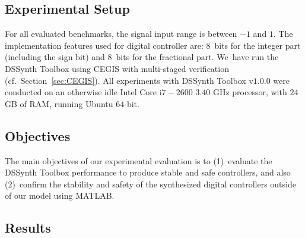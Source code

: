 \documentclass[conference]{IEEEtran}
\newcommand\tool{{DSSynth Toolbox}\xspace}
\begin{document}

\subsection{Experimental Setup}
\label{experimental-setup}

For all evaluated benchmarks, the signal input range is between $-1$ and $1$.  
The implementation features used for
digital controller are: $8$~bits for the integer part (including the sign
bit) and $8$~bits for the fractional part.  We~have run the \tool using
CEGIS with multi-staged verification (cf.~Section~\ref{sec:CEGIS}).  All
experiments with \tool v$1$.$0$.$0$ were conducted on an otherwise idle
Intel Core i$7-2600$ $3.40$ GHz processor, with $24$ GB of RAM, running
Ubuntu $64$-bit.

\subsection{Objectives}

The main objectives of our experimental evaluation is to (1)~evaluate the
\tool performance to produce stable and safe controllers, and also
(2)~confirm the stability and safety of the synthesized digital controllers
outside of our model using MATLAB.


\subsection{Results}
\end{document}
